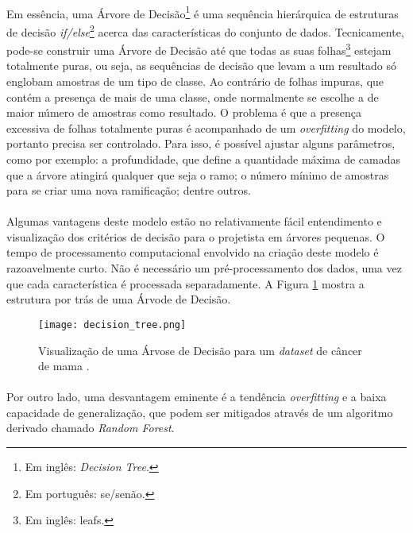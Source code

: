 \paragraph{} Em essência, uma Árvore de Decisão\footnote{Em inglês: \textit{Decision Tree}.} é uma sequência hierárquica de estruturas de decisão \textit{if/else}\footnote{Em português: se/senão.} acerca das características do conjunto de dados. Tecnicamente, pode-se construir uma Árvore de Decisão até que todas as suas folhas\footnote{Em inglês: leafs.} estejam totalmente puras, ou seja, as sequências de decisão que levam a um resultado só englobam amostras de um tipo de classe. Ao contrário de folhas impuras, que contém a presença de mais de uma classe, onde normalmente se escolhe a de maior número de amostras como resultado. O problema é que a presença excessiva de folhas totalmente puras é acompanhado de um \textit{overfitting} do modelo, portanto precisa ser controlado. Para isso, é possível ajustar alguns parâmetros, como por exemplo: a profundidade, que define a quantidade máxima de camadas que a árvore atingirá qualquer que seja o ramo; o número mínimo de amostras para se criar uma nova ramificação; dentre outros.

\paragraph{} Algumas vantagens deste modelo estão no relativamente fácil entendimento e visualização dos critérios de decisão para o projetista em árvores pequenas. O tempo de processamento computacional envolvido na criação deste modelo é razoavelmente curto. Não é necessário um pré-processamento dos dados, uma vez que cada característica é processada separadamente. A Figura \ref{fig:9} mostra a estrutura por trás de uma Árvode de Decisão.

\begin{figure}[h]
    \texttt{[image: decision\_tree.png]}
    \centering
    \caption{Visualização de uma Árvose de Decisão para um \textit{dataset} de câncer de mama \cite{muller2016introduction}.}
    \label{fig:9}
\end{figure}

\paragraph{} Por outro lado, uma desvantagem eminente é a tendência \textit{overfitting} e a baixa capacidade de generalização, que podem ser mitigados através de um algoritmo derivado chamado \textit{Random Forest}.


